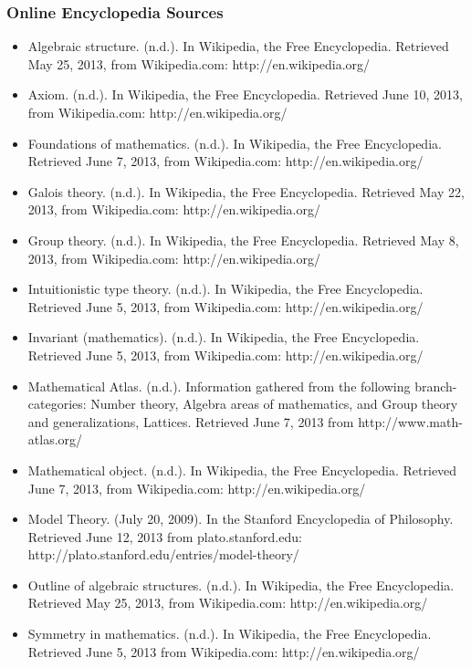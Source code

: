 \documentclass{beamer}
\begin{document}
				\begin{frame}[allowframebreaks]
				\frametitle<presentation>{Online Encyclopedia Sources}
				\begin{itemize}
				\item Algebraic structure. (n.d.). In Wikipedia, the Free Encyclopedia. Retrieved May 25, 2013, from Wikipedia.com: http://en.wikipedia.org/
				\item Axiom. (n.d.). In Wikipedia, the Free Encyclopedia. Retrieved June 10, 2013, from Wikipedia.com: http://en.wikipedia.org/
				\item Foundations of mathematics. (n.d.). In Wikipedia, the Free Encyclopedia. Retrieved June 7, 2013, from Wikipedia.com: http://en.wikipedia.org/
				\item Galois theory. (n.d.). In Wikipedia, the Free Encyclopedia. Retrieved May 22, 2013, from Wikipedia.com: http://en.wikipedia.org/
				\item Group theory. (n.d.). In Wikipedia, the Free Encyclopedia. Retrieved May 8, 2013, from Wikipedia.com: http://en.wikipedia.org/
				\item Intuitionistic type theory. (n.d.). In Wikipedia, the Free Encyclopedia. Retrieved June 5, 2013, from Wikipedia.com: http://en.wikipedia.org/
				\item Invariant (mathematics). (n.d.). In Wikipedia, the Free Encyclopedia. Retrieved June 5, 2013, from Wikipedia.com: http://en.wikipedia.org/
				\item Mathematical Atlas. (n.d.). Information gathered from the following branch-categories: Number theory, Algebra areas of mathematics, and Group theory and generalizations, Lattices. Retrieved June 7, 2013 from http://www.math-atlas.org/
				\item Mathematical object. (n.d.). In Wikipedia, the Free Encyclopedia. Retrieved June 7, 2013, from Wikipedia.com: http://en.wikipedia.org/
				\item Model Theory. (July 20, 2009). In the Stanford Encyclopedia of Philosophy. Retrieved June 12, 2013 from plato.stanford.edu: http://plato.stanford.edu/entries/model-theory/
				\item Outline of algebraic structures. (n.d.). In Wikipedia, the Free Encyclopedia. Retrieved May 25, 2013, from Wikipedia.com: http://en.wikipedia.org/
				\item Symmetry in mathematics. (n.d.). In Wikipedia, the Free Encyclopedia. Retrieved June 5, 2013 from Wikipedia.com: http://en.wikipedia.org/
				\end{itemize}
				\end{frame}
\end{document}

